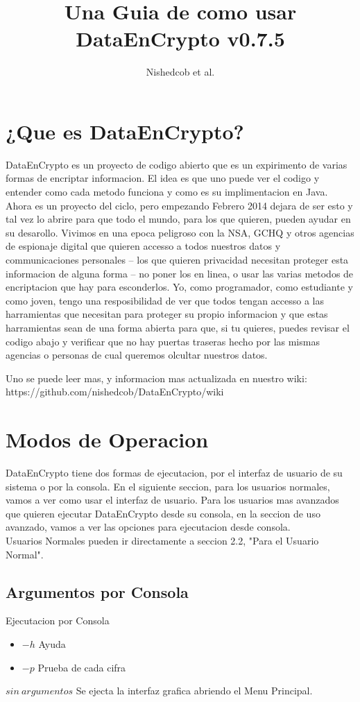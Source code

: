 \documentclass{article}
\author{Nishedcob et al.}
\title{Una Guia de como usar DataEnCrypto v0.7.5}
\date{}
\begin{document}
	\maketitle
	\tableofcontents
	\section{¿Que es DataEnCrypto?}
		DataEnCrypto es un proyecto de codigo abierto que es un expirimento de varias formas de encriptar informacion. El idea es que uno puede ver el codigo y entender como cada metodo funciona y como es su implimentacion en Java. Ahora es un proyecto del ciclo, pero empezando Febrero 2014 dejara de ser esto y tal vez lo abrire para que todo el mundo, para los que quieren, pueden ayudar en su desarollo. Vivimos en una epoca peligroso con la NSA, GCHQ y otros agencias de espionaje digital que quieren accesso a todos nuestros datos y communicaciones personales -- los que quieren privacidad necesitan proteger esta informacion de alguna forma -- no poner los en linea, o usar las varias metodos de encriptacion que hay para esconderlos. Yo, como programador, como estudiante y como joven, tengo una resposibilidad de ver que todos tengan accesso a las harramientas que necesitan para proteger su propio informacion y que estas harramientas sean de una forma abierta para que, si tu quieres, puedes revisar el codigo abajo y verificar que no hay puertas traseras hecho por las mismas agencias o personas de cual queremos olcultar nuestros datos.

		Uno se puede leer mas, y informacion mas actualizada en nuestro wiki: https://github.com/nishedcob/DataEnCrypto/wiki
	\section{Modos de Operacion}
		DataEnCrypto tiene dos formas de ejecutacion, por el interfaz de usuario de su sistema o por la consola. En el siguiente seccion, para los usuarios normales, vamos a ver como usar el interfaz de usuario. Para los usuarios mas avanzados que quieren ejecutar DataEnCrypto desde su consola, en la seccion de uso avanzado, vamos a ver las opciones para ejecutacion desde consola. \\
		Usuarios Normales pueden ir directamente a seccion 2.2, "Para el Usuario Normal".
		\subsection{Argumentos por Consola}
			Ejecutacion por Consola
			\begin{itemize}
				\item $-h$ Ayuda
				\item $-p$ Prueba de cada cifra
			\end{itemize}
			$sin\ argumentos$ Se ejecta la interfaz grafica abriendo el Menu Principal. \\
\end{document}
